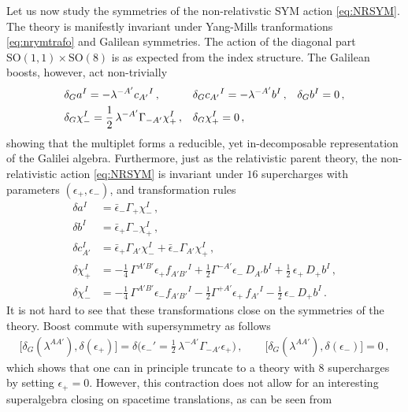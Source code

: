 \documentclass[a4paper,10pt,openany]{article}
\begin{document}
	Let us now study the symmetries of the non-relativstic SYM action \eqref{eq:NRSYM}. The theory is manifestly invariant under Yang-Mills tranformations \eqref{eq:nrymtrafo} and Galilean symmetries. The action of the diagonal part $\mathrm{SO}(1,1)\times\mathrm{SO}(8)$ is as expected from the index structure. The Galilean boosts, however, act non-trivially
	\begin{align}\label{eq:ymboost}
		&\delta_G a^I = -\lambda^{-A'}c_{A'}{}^I\,,&& \delta_G c_{A'}{}^I = -\lambda^{-A'}b^I\,,&& \delta_G b^I =0\,, \notag\\
		&\delta_G \chi_-^I = \frac12\,\lambda^{-A'}\Gamma_{-A'}\chi_+^I\,,&& \delta_G \chi_+^I=0\,,
	\end{align}
	showing that the multiplet forms a reducible, yet in-decomposable representation of the Galilei algebra. Furthermore, just as the relativistic parent theory, the non-relativistic action \eqref{eq:NRSYM} is invariant under $16$ supercharges with parameters $(\epsilon_+,\epsilon_-)$, and transformation rules
	\begin{subequations}
		\label{eq:nrymsusy}
		\begin{align}
			\delta a^I &= \bar{\epsilon}_-\Gamma_+\chi_-^I\,,\\
			\delta b^I &= \bar\epsilon_+\Gamma_-\chi_+^I\,,\\
			\delta c_{A'}^I &= \bar\epsilon_+\Gamma_{A'}\chi_-^I + \bar\epsilon_-\Gamma_{A'}\chi_+^I\,,\\
			\delta \chi_+^I &= -\frac{1}{4}\,\Gamma^{A'B'}\epsilon_+ f_{A'B'}{}^I + \frac{1}{2}\Gamma^{-A'}\epsilon_-\,D_{A'}b^I + \frac{1}{2}\,\epsilon_+\,D_+b^I \,,\\
			\delta\chi_-^I &= -\frac{1}{4}\,\Gamma^{A'B'}\epsilon_- f_{A'B'}{}^I - \frac{1}{2}\Gamma^{+A'}\epsilon_+\,f_{A'}{}^I -\frac12\,\epsilon_-\,D_+b^I\,.
		\end{align}
	\end{subequations}
	It is not hard to see that these transformations close on the symmetries of the theory. Boost commute with supersymmetry as follows
	\begin{align}
		\big[\delta_G(\lambda^{AA'}),\delta(\epsilon_+)\big] = \delta\big(\epsilon_-'=\frac12\,\lambda^{-A'}\Gamma_{-A'}\epsilon_+\big)\,,\qquad \big[\delta_G(\lambda^{AA'}),\delta(\epsilon_-)\big] = 0\,,
	\end{align}
	which shows that one can in principle truncate to a theory with $8$ supercharges by setting $\epsilon_+=0$. However, this contraction does not allow for an interesting superalgebra closing on spacetime translations, as can be seen from
\end{document}
